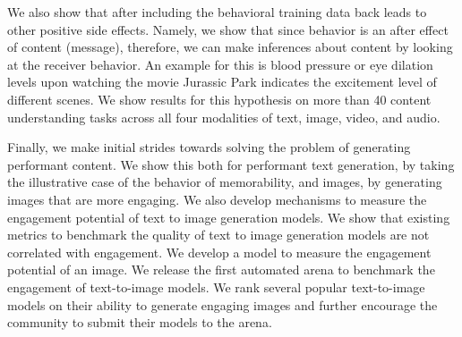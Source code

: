 We also show that after including the behavioral training data back leads to other positive side effects. Namely, we show that since behavior is an after effect of content (message), therefore, we can make inferences about content by looking at the receiver behavior. An example for this is blood pressure or eye dilation levels upon watching the movie Jurassic Park indicates the excitement level of different scenes. We show results for this hypothesis on more than 40 content understanding tasks across all four modalities of text, image, video, and audio.


Finally, we make initial strides towards solving the problem of generating performant content. We show this both for performant text generation, by taking the illustrative case of the behavior of memorability, and images, by generating images that are more engaging. We also develop mechanisms to measure the engagement potential of text to image generation models. We show that existing metrics to benchmark the quality of text to image generation models are not correlated with engagement. We develop a model to measure the engagement potential of an image. We release the first automated arena to benchmark the engagement of text-to-image models. We rank several popular text-to-image models on their ability to generate engaging images and further encourage the community to submit their models to the arena.
